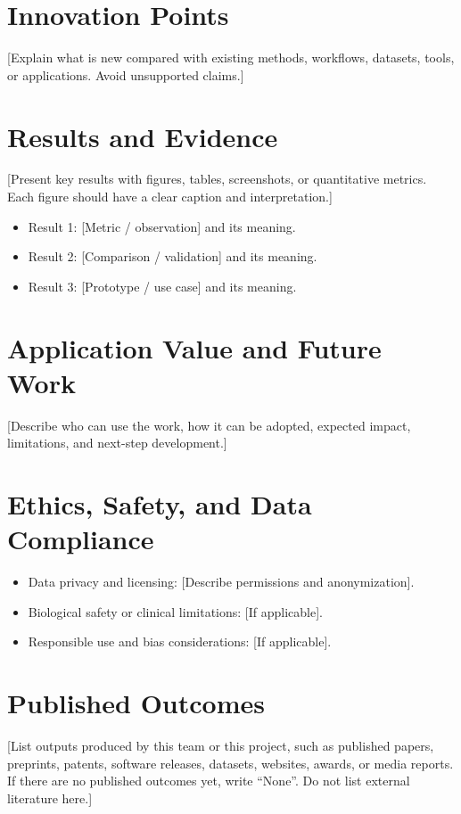 \documentclass[11pt,a4paper]{article}
\newcommand{\placeholder}[1]{[#1]}
\begin{document}
\section{Innovation Points}
\placeholder{Explain what is new compared with existing methods, workflows, datasets, tools, or applications. Avoid unsupported claims.}

\section{Results and Evidence}
\placeholder{Present key results with figures, tables, screenshots, or quantitative metrics. Each figure should have a clear caption and interpretation.}
\begin{itemize}
  \item Result 1: \placeholder{Metric / observation} and its meaning.
  \item Result 2: \placeholder{Comparison / validation} and its meaning.
  \item Result 3: \placeholder{Prototype / use case} and its meaning.
\end{itemize}

\section{Application Value and Future Work}
\placeholder{Describe who can use the work, how it can be adopted, expected impact, limitations, and next-step development.}

\section{Ethics, Safety, and Data Compliance}
\begin{itemize}
  \item Data privacy and licensing: \placeholder{Describe permissions and anonymization}.
  \item Biological safety or clinical limitations: \placeholder{If applicable}.
  \item Responsible use and bias considerations: \placeholder{If applicable}.
\end{itemize}

\section{Published Outcomes}
\placeholder{List outputs produced by this team or this project, such as published papers, preprints, patents, software releases, datasets, websites, awards, or media reports. If there are no published outcomes yet, write ``None''. Do not list external literature here.}
\end{document}
